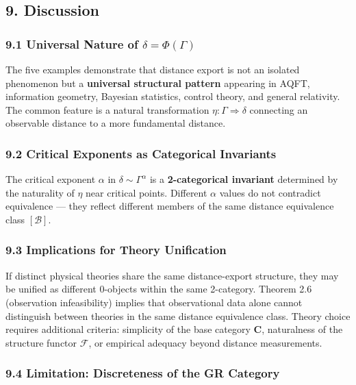 \documentclass[
]{article}
\begin{document}
\subsection{9. Discussion}\label{discussion}

\subsubsection{\texorpdfstring{9.1 Universal Nature of
\(\delta = \Phi(\Gamma)\)}{9.1 Universal Nature of \textbackslash delta = \textbackslash Phi(\textbackslash Gamma)}}\label{universal-nature-of-delta-phigamma}

The five examples demonstrate that distance export is not an isolated
phenomenon but a \textbf{universal structural pattern} appearing in
AQFT, information geometry, Bayesian statistics, control theory, and
general relativity. The common feature is a natural transformation
\(\eta: \Gamma \Rightarrow \delta\) connecting an observable distance to
a more fundamental distance.

\subsubsection{9.2 Critical Exponents as Categorical
Invariants}\label{critical-exponents-as-categorical-invariants}

The critical exponent \(\alpha\) in \(\delta \sim \Gamma^\alpha\) is a
\textbf{2-categorical invariant} determined by the naturality of
\(\eta\) near critical points. Different \(\alpha\) values do not
contradict equivalence --- they reflect different members of the same
distance equivalence class \([\mathcal{B}]\).

\subsubsection{9.3 Implications for Theory
Unification}\label{implications-for-theory-unification}

If distinct physical theories share the same distance-export structure,
they may be unified as different 0-objects within the same 2-category.
Theorem 2.6 (observation infeasibility) implies that observational data
alone cannot distinguish between theories in the same distance
equivalence class. Theory choice requires additional criteria:
simplicity of the base category \(\mathbf{C}\), naturalness of the
structure functor \(\mathcal{F}\), or empirical adequacy beyond distance
measurements.

\subsubsection{9.4 Limitation: Discreteness of the GR
Category}\label{limitation-discreteness-of-the-gr-category}
\end{document}
